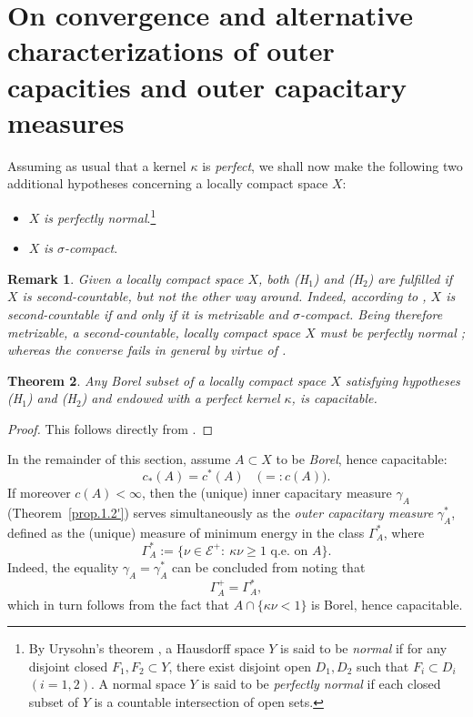 \documentclass[12pt,a4paper,reqno]{amsart} %
\theoremstyle{lause}
\theoremstyle{maaritelma}
\theoremstyle{lause}
\newtheorem{theorem}{Theorem}[section]
\theoremstyle{maaritelma}
\newtheorem{remark}[theorem]{Remark}
\numberwithin{equation}{section}
\begin{document}
\section{On convergence and alternative characterizations of outer capacities and outer capacitary measures}\label{sec-ou-chara}

Assuming as usual that a kernel $\kappa$ is {\it perfect}, we shall now make the following two additional hypotheses concerning a locally compact space $X$:
\begin{itemize}\item[(H$_1$)] $X$ {\it is perfectly normal}.\footnote{By Urysohn's theorem \cite[Section~IX.1, Theorem~1]{B3}, a Hausdorff space $Y$ is said to be {\it normal\/} if for any disjoint closed $F_1,F_2\subset Y$, there exist disjoint open $D_1,D_2$ such that $F_i\subset D_i$ $(i=1,2)$. A normal space $Y$ is said to be {\it perfectly normal\/} \cite[Section~IX.4, Exercise~7]{B3} if each closed subset of $Y$ is a countable intersection of open sets.}
\item[(H$_2$)] $X$ {\it is\/ $\sigma$-compact}.\end{itemize}

\begin{remark} Given a locally compact space $X$, {\it both\/ {\rm(H$_1$)} and\/ {\rm(H$_2$)} are fulfilled if $X$ is sec\-ond-count\-able, but not the other way around.} Indeed, according to \cite[Section~IX.2, Corollary to Proposition~16]{B3}, $X$ is sec\-ond-count\-able if and only if it is metrizable and $\sigma$-com\-pact. Being therefore metrizable, a sec\-ond-count\-able, locally compact space $X$ must be perfectly normal \cite[Section~IX.1, Proposition~2]{B3}; whereas the converse fails in general by virtue of \cite[Section~IX.2, Exercise~13(b)]{B3}.\end{remark}

\begin{theorem}\label{l-top}Any Borel subset of a locally compact space\/ $X$ satisfying hypotheses\/ {\rm(H$_1$)} and\/ {\rm(H$_2$)} and endowed with a perfect kernel\/ $\kappa$, is capacitable.\end{theorem}

\begin{proof}This follows directly from \cite[Theorem~4.5]{F1}.\end{proof}

In the remainder of this section, assume $A\subset X$ to be {\it Borel}, hence capacitable:
\[c_*(A)=c^*(A)\quad\bigl({}=:c(A)\bigr).\]
If moreover $c(A)<\infty$, then the (unique) inner capacitary measure $\gamma_A$ (Theorem~\ref{prop.1.2'}) serves simultaneously as the {\it outer capacitary measure\/} $\gamma^*_A$, defined as the (unique) measure of minimum energy  in the class $\Gamma^*_A$, where
\[\Gamma^*_A:=\bigl\{\nu\in\mathcal E^+: \ \kappa\nu\geqslant1\text{ \ q.e.\ on $A$}\bigr\}.\]
Indeed, the equality $\gamma_A=\gamma_A^*$ can be concluded from \cite[Theorem~4.3]{F1} noting that
\[\Gamma^+_A=\Gamma^*_A,\]
which in turn follows from the fact that $A\cap\{\kappa\nu<1\bigr\}$ is Borel, hence capacitable.
\end{document}
